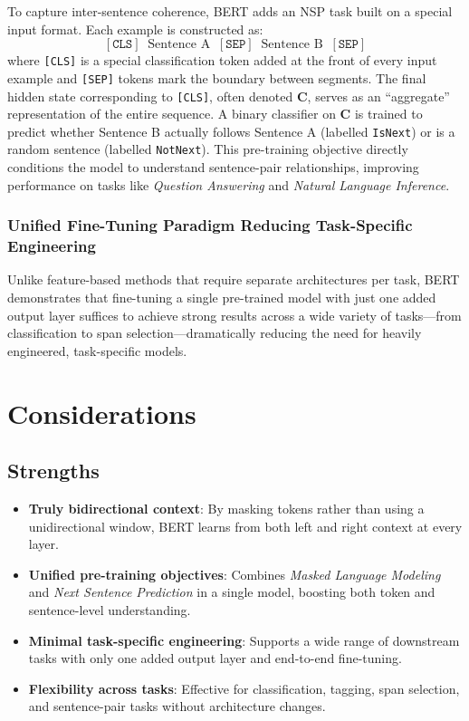 \documentclass[10pt]{article}
\begin{document}
To capture inter-sentence coherence, BERT adds an NSP task built on a special input format. Each example is constructed as:
\[
    [\texttt{CLS}] \;\;\text{Sentence A}\;\; [\texttt{SEP}]\;\;\text{Sentence B}\;\; [\texttt{SEP}]
\]
where \texttt{[CLS]} is a special classification token added at the front of every input example and \texttt{[SEP]} tokens mark the boundary between segments. The final hidden state corresponding to \texttt{[CLS]}, often denoted \(\mathbf{C}\), serves as an ``aggregate'' representation of the entire sequence. A binary classifier on \(\mathbf{C}\) is trained to predict whether Sentence B actually follows Sentence A (labelled \texttt{IsNext}) or is a random sentence (labelled \texttt{NotNext}). This pre-training objective directly conditions the model to understand sentence-pair relationships, improving performance on tasks like \textit{Question Answering} and \textit{Natural Language Inference}.


\subsubsection*{Unified Fine-Tuning Paradigm Reducing Task-Specific Engineering}

Unlike feature-based methods that require separate architectures per task, BERT demonstrates that fine-tuning a single pre-trained model with just one added output layer suffices to achieve strong results across a wide variety of tasks—from classification to span selection—dramatically reducing the need for heavily engineered, task-specific models.


\section*{Considerations}
\subsection*{Strengths}

\begin{itemize}
    \item \textbf{Truly bidirectional context}: By masking tokens rather than using a unidirectional window, BERT learns from both left and right context at every layer.
    \item \textbf{Unified pre-training objectives}: Combines \textit{Masked Language Modeling} and \textit{Next Sentence Prediction} in a single model, boosting both token and sentence-level understanding.
    \item \textbf{Minimal task-specific engineering}: Supports a wide range of downstream tasks with only one added output layer and end-to-end fine-tuning.
    \item \textbf{Flexibility across tasks}: Effective for classification, tagging, span selection, and sentence-pair tasks without architecture changes.
\end{itemize}
\end{document}
